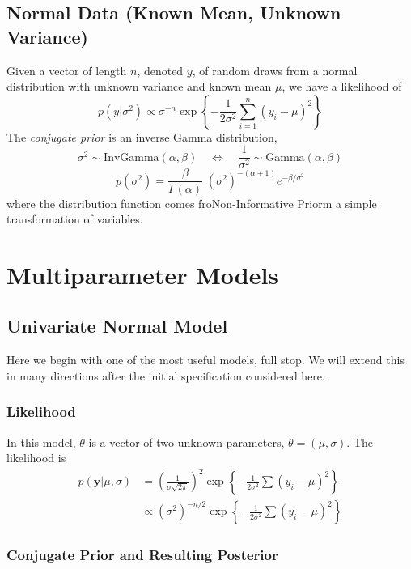 \documentclass[12pt]{article}
\begin{document}
\newpage
\subsection{Normal Data (Known Mean, Unknown Variance)}

Given a vector of length $n$, denoted $y$, of random draws from 
a normal distribution with unknown variance and known mean $\mu$, we
have a likelihood of
   \[ p(y|\sigma^2) \propto \sigma^{-n} \exp\left\{ 
      -\frac{1}{2\sigma^2} \sum^n_{i=1} (y_i - \mu)^2 \right\} \]
The \emph{conjugate prior} is an inverse Gamma distribution,
\[ \sigma^2 \sim \text{InvGamma}(\alpha, \beta) \quad
   \Leftrightarrow \quad 
   \frac{1}{\sigma^2} \sim \text{Gamma}(\alpha, \beta)
   \]
   \[ p(\sigma^2) = \frac{\beta}{\Gamma(\alpha)} \; 
      (\sigma^2)^{-(\alpha+1)} 
      e^{-\beta/\sigma^2} \]
where the distribution function comes froNon-Informative Priorm a simple 
transformation of variables.



\newpage
\section{Multiparameter Models}

\subsection{Univariate Normal Model}

Here we begin with one of the most useful models, full stop. We
will extend this in many directions after the initial specification
considered here.

\subsubsection{Likelihood}
In this model, $\theta$ is a vector of two unknown parameters,
$\theta=(\mu,\sigma)$. The likelihood is
\begin{align*}
   p(\mathbf{y}|\mu,\sigma) &= 
      \left(\frac{1}{\sigma\sqrt{2\pi}}\right)^2
      \exp\left\{ -\frac{1}{2\sigma^2} \sum (y_i-\mu)^2 \right\}\\
   &\propto (\sigma^2)^{-n/2} 
      \exp\left\{ -\frac{1}{2\sigma^2} \sum (y_i-\mu)^2 \right\}
\end{align*}

\subsubsection{Conjugate Prior and Resulting Posterior} 
\end{document}
